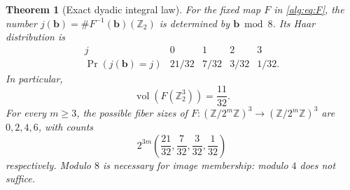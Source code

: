 \documentclass[11pt]{article}
\numberwithin{equation}{section}
\newtheorem{theorem}{Theorem}[section]
\theoremstyle{plain}
\theoremstyle{plain}
\theoremstyle{plain}
\theoremstyle{definition}
\theoremstyle{definition}
\theoremstyle{definition}
\theoremstyle{remark}
\newcommand{\Z}{\mathbb Z}\newcommand{\Q}{\mathbb Q}
\newcommand{\vol}{\operatorname{vol}}
\newcommand{\target}{\boldsymbol b}
\begin{document}
\begin{theorem}[Exact dyadic integral law]\label{alg:thm:dyadic}
For the fixed map $F$ in \eqref{alg:eq:F}, the number
$j(\target)=\#F^{-1}(\target)(\Z_2)$ is determined by
$\target\bmod8$. Its Haar distribution is
\begin{equation}\label{alg:eq:dyadiclaw}
\begin{array}{c|rrrr}
 j&0&1&2&3\\ \hline
 \Pr(j(\target)=j)&21/32&7/32&3/32&1/32.
\end{array}
\end{equation}
In particular,
\begin{equation}\label{alg:eq:rho2}
 \vol(F(\Z_2^3))=\frac{11}{32}.
\end{equation}
For every $m\ge3$, the possible fiber sizes of
$F:(\Z/2^m\Z)^3\to(\Z/2^m\Z)^3$ are $0,2,4,6$, with counts
\begin{equation}\label{alg:eq:dyadicfinite}
 2^{3m}\left(\frac{21}{32},\frac7{32},\frac3{32},\frac1{32}\right)
\end{equation}
respectively. Modulo $8$ is necessary for image membership: modulo $4$
does not suffice.
\end{theorem}
\end{document}
